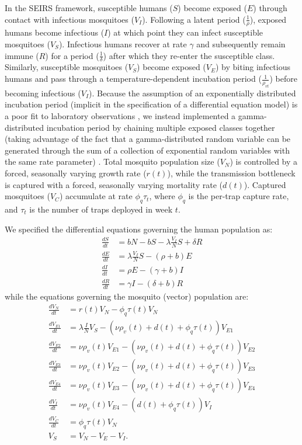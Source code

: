 \documentclass[10pt,letterpaper]{article}
\begin{document}
In the SEIRS framework, susceptible humans ($S$) become exposed ($E$) through contact with infectious mosquitoes ($V_I$).
Following a latent period ($\frac{1}{\rho}$), exposed humans become infectious ($I$) at which point they can infect susceptible mosquitoes ($V_S$).
Infectious humans recover at rate $\gamma$ and subsequently remain immune ($R$) for a period ($\frac{1}{\delta}$) after which they re-enter the susceptible class.
Similarly, susceptible mosquitoes ($V_S$) become exposed ($V_E$) by biting infectious humans and pass through a temperature-dependent incubation period ($\frac{1}{\rho_{vt}}$) before becoming infectious ($V_I$).
Because the assumption of an exponentially distributed incubation period (implicit in the specification of a differential equation model) is a poor fit to laboratory observations \cite{Chan2012}, we instead implemented a gamma-distributed incubation period by chaining multiple exposed classes together (taking advantage of the fact that a gamma-distributed random variable can be generated through the sum of a collection of exponential random variables with the same rate parameter) \cite{Lloyd2001}.
Total mosquito population size ($V_N$) is controlled by a forced, seasonally varying growth rate ($r(t)$), while the transmission bottleneck is captured with a forced, seasonally varying mortality rate ($d(t)$).
Captured mosquitoes ($V_C$) accumulate at rate $\phi_q \tau_t$, where $\phi_q$ is the per-trap capture rate, and $\tau_t$ is the number of traps deployed in week $t$.

We specified the differential equations governing the human population as:
\begin{align} 
\frac{dS}{dt} &= bN - bS - \lambda \frac{V_{I}}{N} S + \delta R\\
\frac{dE}{dt} &= \lambda \frac{V_{I}}{N} S - (\rho + b)E\\
\frac{dI}{dt} &= \rho E - (\gamma + b)I\\
\frac{dR}{dt} &= \gamma I - (\delta + b)R
\end{align}
while the equations governing the mosquito (vector) population are:
\begin{align}
\frac{dV_N}{dt} & = r(t) V_N - \phi_q \tau(t) V_N \\
\frac{dV_{E1}}{dt} &= \lambda \frac{I}{N} V_S - (\nu\rho_{v}(t) + d(t) + \phi_q \tau(t))V_{E1}\\
\frac{dV_{E2}}{dt} &= \nu\rho_{v}(t) V_{E1} - (\nu\rho_{v}(t) + d(t) + \phi_q \tau(t))V_{E2}\\
\frac{dV_{E3}}{dt} &= \nu\rho_{v}(t) V_{E2}  - (\nu\rho_{v}(t) + d(t) + \phi_q \tau(t))V_{E3}\\
\frac{dV_{E4}}{dt} &= \nu\rho_{v}(t) V_{E3}  - (\nu\rho_{v}(t) + d(t) + \phi_q \tau(t))V_{E4}\\
\frac{dV_I}{dt} &= \nu\rho_{v}(t) V_{E4} - (d(t) + \phi_q \tau(t)) V_I\\
\frac{dV_C}{dt} & = \phi_q \tau(t) V_N\\
V_S &= V_N - V_E - V_I.
\end{align}
\end{document}
